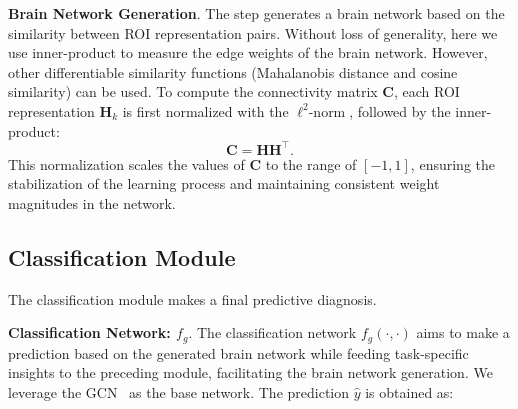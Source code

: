 \vspace{1pt}
\noindent \textbf{Brain Network Generation}. The step generates a brain network based on the similarity between ROI representation pairs. Without loss of generality, here we use inner-product to measure the edge weights of the brain network. However, other differentiable similarity functions (\eg Mahalanobis distance and cosine similarity) can be used. To compute the connectivity matrix $\mathbf{C}$, each ROI representation $\mathbf{H}_{k}$ is first normalized with the $\ell^{2}\text{-norm}$, followed by the inner-product:
\begin{equation}
    \mathbf{C} = \mathbf{H} \mathbf{H^\top}.
\end{equation}
This normalization scales the values of $\mathbf{C}$ to the range of $[-1, 1]$, ensuring the stabilization of the learning process and maintaining consistent weight magnitudes in the network.

\subsection{Classification Module}
The classification module makes a final predictive diagnosis.

\vspace{1pt}
\noindent \textbf{Classification Network: $f_g$}. The classification network $f_{g}(\cdot, \cdot)$ aims to make a prediction based on the generated brain network while feeding task-specific insights to the preceding module, facilitating the brain network generation. We leverage the GCN~\cite{kipf2017semi} as the base network. The prediction $\hat{y}$ is obtained as:

